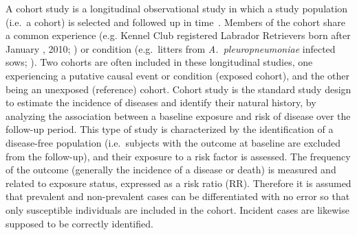 A cohort study is a longitudinal observational study in which a study population
(i.e.\ a cohort)  is selected and followed up in
time~\citep{DosSantosSilva1999,Rothman2012}.
Members of the cohort share a common experience (e.g. Kennel Club registered
Labrador Retrievers born after January , 2010; \citealp{Clements_2013}) or
condition (e.g.\ litters from \emph{A.\ pleuropneumoniae} infected sows; \citealp{Tobias_2014}).
Two cohorts are often included in these longitudinal studies, one experiencing a
putative causal event or condition (exposed cohort), and the other being an
unexposed (reference) cohort.
Cohort study is the standard study design to estimate the incidence of diseases
and identify their natural history, by analyzing the association between a
baseline exposure and risk of disease over the follow-up period.
This type of study is characterized by the identification of a disease-free
population (i.e.\ subjects with the outcome at baseline are excluded from the
follow-up), and their exposure to a risk factor is assessed.
The frequency of the outcome (generally the incidence of a disease or death) is
measured and related to exposure status, expressed as a risk ratio (RR).
Therefore it is assumed that prevalent and non-prevalent cases can be
differentiated with no error so that only susceptible individuals are included
in the cohort.
Incident cases are likewise supposed to be correctly identified.

